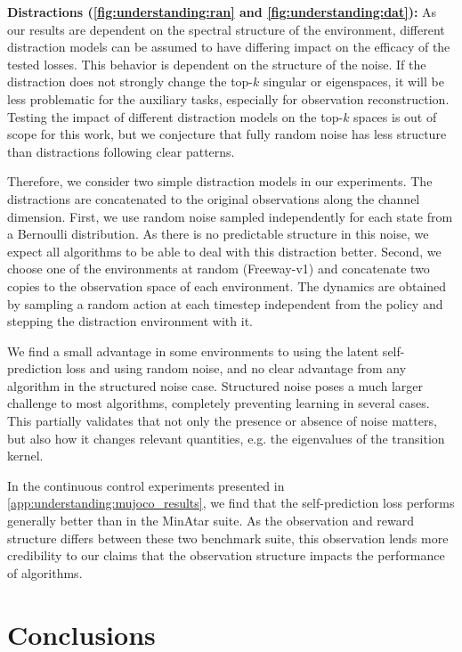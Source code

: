 \textbf{Distractions (\autoref{fig:understanding:ran} and \autoref{fig:understanding:dat}):}
As our results are dependent on the spectral structure of the environment, different distraction models can be assumed to have differing impact on the efficacy of the tested losses.
This behavior is dependent on the structure of the noise.
If the distraction does not strongly change the top-$k$ singular or eigenspaces, it will be less problematic for the auxiliary tasks, especially for observation reconstruction.
Testing the impact of different distraction models on the top-$k$ spaces is out of scope for this work, but we conjecture that fully random noise has less structure than distractions following clear patterns.

Therefore, we consider two simple distraction models in our experiments. 
The distractions are concatenated to the original observations along the channel dimension.
First, we use random noise sampled independently for each state from a Bernoulli distribution.
As there is no predictable structure in this noise, we expect all algorithms to be able to deal with this distraction better.
Second, we choose one of the environments at random (Freeway-v1) and concatenate two copies to the observation space of each environment.
The dynamics are obtained by sampling a random action at each timestep independent from the policy and stepping the distraction environment with it.

We find a small advantage in some environments to using the latent self-prediction loss and using random noise, and no clear advantage from any algorithm in the structured noise case.
Structured noise poses a much larger challenge to most algorithms, completely preventing learning in several cases.
This partially validates that not only the presence or absence of noise matters, but also how it changes relevant quantities, e.g. the eigenvalues of the transition kernel.

In the continuous control experiments presented in \autoref{app:understanding:mujoco_results}, we find that the self-prediction loss performs generally better than in the MinAtar suite.
As the observation and reward structure differs between these two benchmark suite, this observation lends more credibility to our claims that the observation structure impacts the performance of algorithms.

\section{Conclusions}

